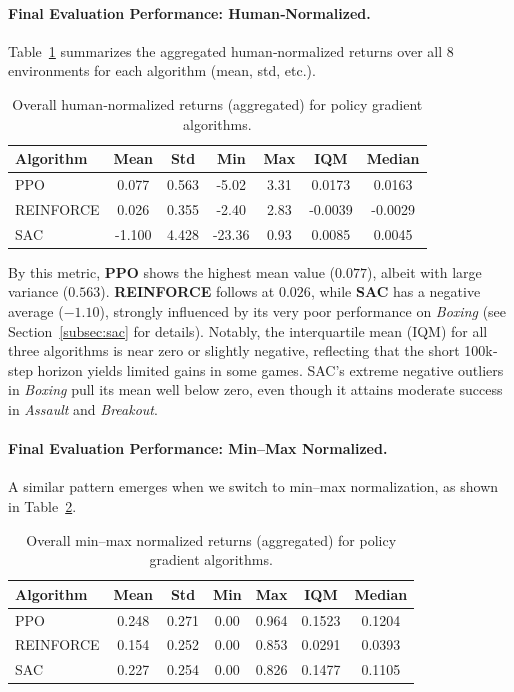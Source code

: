 \paragraph{Final Evaluation Performance: Human‐Normalized.}
Table~\ref{tab:policy_final_eval_human} summarizes the aggregated human‐normalized returns over all 8 environments for each algorithm (mean, std, etc.). 
\begin{table} 
	\centering
	\caption{Overall human‐normalized returns (aggregated) for policy gradient algorithms.}
	\label{tab:policy_final_eval_human}
	\begin{tabular}{lcccccc}
		\toprule
		\textbf{Algorithm} & \textbf{Mean} & \textbf{Std} & \textbf{Min} & \textbf{Max} & \textbf{IQM} & \textbf{Median} \\
		\midrule
		PPO         & 0.077 & 0.563 & -5.02 & 3.31 & 0.0173 & 0.0163 \\
		REINFORCE   & 0.026 & 0.355 & -2.40 & 2.83 & -0.0039 & -0.0029 \\
		SAC         & -1.100 & 4.428 & -23.36 & 0.93 & 0.0085 & 0.0045 \\
		\bottomrule
	\end{tabular}
\end{table}

\noindent
By this metric, \textbf{PPO} shows the highest mean value ($0.077$), albeit with large variance ($0.563$). \textbf{REINFORCE} follows at $0.026$, while \textbf{SAC} has a negative average ($-1.10$), strongly influenced by its very poor performance on \emph{Boxing} (see Section~\ref{subsec:sac} for details). Notably, the interquartile mean (IQM) for all three algorithms is near zero or slightly negative, reflecting that the short 100k‐step horizon yields limited gains in some games. SAC’s extreme negative outliers in \emph{Boxing} pull its mean well below zero, even though it attains moderate success in \emph{Assault} and \emph{Breakout}.

\paragraph{Final Evaluation Performance: Min–Max Normalized.}
A similar pattern emerges when we switch to min–max normalization, as shown in Table~\ref{tab:policy_final_eval_minmax}.

\begin{table} 
	\centering
	\caption{Overall min--max normalized returns (aggregated) for policy gradient algorithms.}
	\label{tab:policy_final_eval_minmax}
	\begin{tabular}{lcccccc}
		\toprule
		\textbf{Algorithm} & \textbf{Mean} & \textbf{Std} & \textbf{Min} & \textbf{Max} & \textbf{IQM} & \textbf{Median} \\
		\midrule
		PPO         & 0.248 & 0.271 & 0.00 & 0.964 & 0.1523 & 0.1204 \\
		REINFORCE   & 0.154 & 0.252 & 0.00 & 0.853 & 0.0291 & 0.0393 \\
		SAC         & 0.227 & 0.254 & 0.00 & 0.826 & 0.1477 & 0.1105 \\
		\bottomrule
	\end{tabular}
\end{table}

